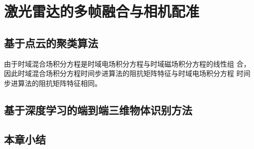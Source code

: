 
\chapter{激光雷达的多帧融合与相机配准}

\section{基于点云的聚类算法}

由于时域混合场积分方程是时域电场积分方程与时域磁场积分方程的线性组
合，因此时域混合场积分方程时间步进算法的阻抗矩阵特征与时域电场积分方程
时间步进算法的阻抗矩阵特征相同。

\section{基于深度学习的端到端三维物体识别方法}

\section{本章小结}


